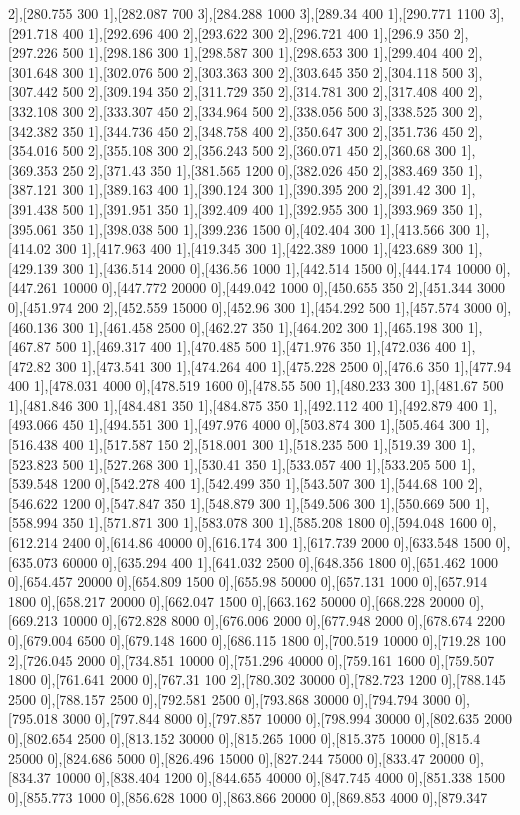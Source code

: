 {2],[280.755 300 1],[282.087 700 3],[284.288 1000 3],[289.34 400 1],[290.771 1100 3],[291.718 400 1],[292.696 400 2],[293.622 300 2],[296.721 400 1],[296.9 350 2],[297.226 500 1],[298.186 300 1],[298.587 300 1],[298.653 300 1],[299.404 400 2],[301.648 300 1],[302.076 500 2],[303.363 300 2],[303.645 350 2],[304.118 500 3],[307.442 500 2],[309.194 350 2],[311.729 350 2],[314.781 300 2],[317.408 400 2],[332.108 300 2],[333.307 450 2],[334.964 500 2],[338.056 500 3],[338.525 300 2],[342.382 350 1],[344.736 450 2],[348.758 400 2],[350.647 300 2],[351.736 450 2],[354.016 500 2],[355.108 300 2],[356.243 500 2],[360.071 450 2],[360.68 300 1],[369.353 250 2],[371.43 350 1],[381.565 1200 0],[382.026 450 2],[383.469 350 1],[387.121 300 1],[389.163 400 1],[390.124 300 1],[390.395 200 2],[391.42 300 1],[391.438 500 1],[391.951 350 1],[392.409 400 1],[392.955 300 1],[393.969 350 1],[395.061 350 1],[398.038 500 1],[399.236 1500 0],[402.404 300 1],[413.566 300 1],[414.02 300 1],[417.963 400 1],[419.345 300 1],[422.389 1000 1],[423.689 300 1],[429.139 300 1],[436.514 2000 0],[436.56 1000 1],[442.514 1500 0],[444.174 10000 0],[447.261 10000 0],[447.772 20000 0],[449.042 1000 0],[450.655 350 2],[451.344 3000 0],[451.974 200 2],[452.559 15000 0],[452.96 300 1],[454.292 500 1],[457.574 3000 0],[460.136 300 1],[461.458 2500 0],[462.27 350 1],[464.202 300 1],[465.198 300 1],[467.87 500 1],[469.317 400 1],[470.485 500 1],[471.976 350 1],[472.036 400 1],[472.82 300 1],[473.541 300 1],[474.264 400 1],[475.228 2500 0],[476.6 350 1],[477.94 400 1],[478.031 4000 0],[478.519 1600 0],[478.55 500 1],[480.233 300 1],[481.67 500 1],[481.846 300 1],[484.481 350 1],[484.875 350 1],[492.112 400 1],[492.879 400 1],[493.066 450 1],[494.551 300 1],[497.976 4000 0],[503.874 300 1],[505.464 300 1],[516.438 400 1],[517.587 150 2],[518.001 300 1],[518.235 500 1],[519.39 300 1],[523.823 500 1],[527.268 300 1],[530.41 350 1],[533.057 400 1],[533.205 500 1],[539.548 1200 0],[542.278 400 1],[542.499 350 1],[543.507 300 1],[544.68 100 2],[546.622 1200 0],[547.847 350 1],[548.879 300 1],[549.506 300 1],[550.669 500 1],[558.994 350 1],[571.871 300 1],[583.078 300 1],[585.208 1800 0],[594.048 1600 0],[612.214 2400 0],[614.86 40000 0],[616.174 300 1],[617.739 2000 0],[633.548 1500 0],[635.073 60000 0],[635.294 400 1],[641.032 2500 0],[648.356 1800 0],[651.462 1000 0],[654.457 20000 0],[654.809 1500 0],[655.98 50000 0],[657.131 1000 0],[657.914 1800 0],[658.217 20000 0],[662.047 1500 0],[663.162 50000 0],[668.228 20000 0],[669.213 10000 0],[672.828 8000 0],[676.006 2000 0],[677.948 2000 0],[678.674 2200 0],[679.004 6500 0],[679.148 1600 0],[686.115 1800 0],[700.519 10000 0],[719.28 100 2],[726.045 2000 0],[734.851 10000 0],[751.296 40000 0],[759.161 1600 0],[759.507 1800 0],[761.641 2000 0],[767.31 100 2],[780.302 30000 0],[782.723 1200 0],[788.145 2500 0],[788.157 2500 0],[792.581 2500 0],[793.868 30000 0],[794.794 3000 0],[795.018 3000 0],[797.844 8000 0],[797.857 10000 0],[798.994 30000 0],[802.635 2000 0],[802.654 2500 0],[813.152 30000 0],[815.265 1000 0],[815.375 10000 0],[815.4 25000 0],[824.686 5000 0],[826.496 15000 0],[827.244 75000 0],[833.47 20000 0],[834.37 10000 0],[838.404 1200 0],[844.655 40000 0],[847.745 4000 0],[851.338 1500 0],[855.773 1000 0],[856.628 1000 0],[863.866 20000 0],[869.853 4000 0],[879.347 }

